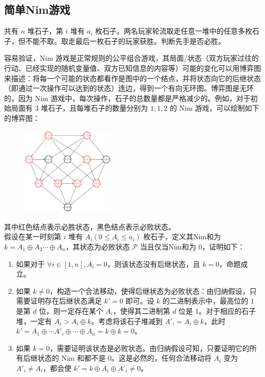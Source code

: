 \documentclass[12pt,a4paper]{article}
\begin{document}
\newpage
\subsection{简单Nim游戏}
\begin{mdframed}[leftline=true, linewidth=2pt, linecolor=gray]
	共有 $n$ 堆石子，第 $i$ 堆有 $a_i$ 枚石子。两名玩家轮流取走任意一堆中的任意多枚石子，但不能不取。取走最后一枚石子的玩家获胜。判断先手是否必胜。
\end{mdframed}
容易验证，Nim 游戏是正常规则的公平组合游戏，其局面/状态（双方玩家过往的行动、已经实现的随机变量值、双方已知信息的内容等）可能的变化可以用博弈图来描述：将每一个可能的状态都看作是图中的一个结点，并将状态向它的后继状态（即通过一次操作可以达到的状态）连边，得到一个有向无环图。博弈图是无环的，因为 Nim 游戏中，每次操作，石子的总数量都是严格减少的。例如，对于初始局面有 $3$ 堆石子，且每堆石子的数量分别为 $1,1,2$ 的 Nim 游戏，可以绘制如下的博弈图：
\begin{figure}[H]
	\centering
	\includegraphics[width=0.4\textwidth]{game1.png}
\end{figure}
\noindent 其中红色结点表示必胜状态，黑色结点表示必败状态。\\
假设在某一时刻第 $i$ 堆有 $A_i(0\le A_i\le a_i)$ 枚石子，定义其Nim和为 $k=A_1\oplus A_2\cdots\oplus A_n$，其状态为必败状态 $\mathcal P$ 当且仅当Nim和为 $0$，证明如下：
\begin{enumerate}
	\item 如果对于 $\forall i\in[1,n],A_i=0$，则该状态没有后继状态，且 $k=0$，命题成立。
	\item 如果 $k\ne0$，构造一个合法移动，使得后继状态为必败状态：由归纳假设，只需要证明存在后继状态满足 $k'=0$ 即可。设 $k$ 的二进制表示中，最高位的 $1$ 是第 $d$ 位，则一定存在某个 $A_i$，使得其二进制第 $d$ 位是 $1$。对于相应的石子堆，一定有 $A_i>A_i\oplus k$。考虑将该石子堆减到 $A'_i=A_i\oplus k$，此时 $k'=A_1\oplus\cdots A'_i\oplus\cdots\oplus A_n=k\oplus k=0$。
	\item 如果 $k=0$，需要证明该状态是必败状态。由归纳假设可知，只要证明它的所有后继状态的 Nim 和都不是 $0$。这是必然的，任何合法移动将 $A_i$ 变为 $A'_i\neq A_i$，都会使 $k'=k\oplus A_i\oplus A'_i\ne0$。
\end{enumerate}
\end{document}
